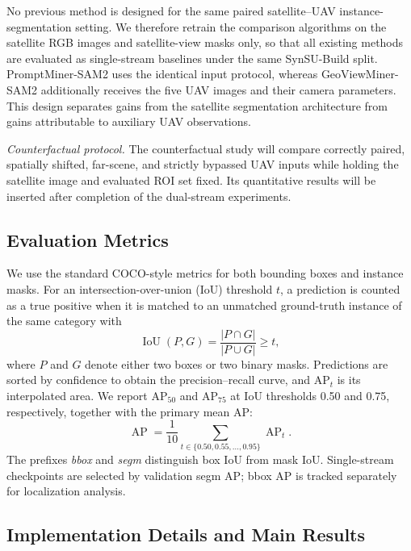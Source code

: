 \documentclass[letterpaper,journal]{IEEEtran}
\begin{document}
No previous method is designed for the same paired satellite--UAV instance-segmentation setting. We therefore retrain the comparison algorithms on the satellite RGB images and satellite-view masks only, so that all existing methods are evaluated as single-stream baselines under the same SynSU-Build split. PromptMiner-SAM2 uses the identical input protocol, whereas GeoViewMiner-SAM2 additionally receives the five UAV images and their camera parameters. This design separates gains from the satellite segmentation architecture from gains attributable to auxiliary UAV observations.

\noindent\textit{Counterfactual protocol.}
The counterfactual study will compare correctly paired, spatially shifted, far-scene, and strictly bypassed UAV inputs while holding the satellite image and evaluated ROI set fixed. Its quantitative results will be inserted after completion of the dual-stream experiments.

\subsection{Evaluation Metrics}
\label{sec:evaluation_metrics}
We use the standard COCO-style metrics for both bounding boxes and instance masks. For an intersection-over-union (IoU) threshold $t$, a prediction is counted as a true positive when it is matched to an unmatched ground-truth instance of the same category with
\begin{equation}
\operatorname{IoU}(P,G)=\frac{|P\cap G|}{|P\cup G|}\geq t,
\end{equation}
where $P$ and $G$ denote either two boxes or two binary masks. Predictions are sorted by confidence to obtain the precision--recall curve, and AP$_t$ is its interpolated area. We report AP$_{50}$ and AP$_{75}$ at IoU thresholds 0.50 and 0.75, respectively, together with the primary mean AP:
\begin{equation}
\operatorname{AP}=\frac{1}{10}\sum_{t\in\{0.50,0.55,\ldots,0.95\}}\operatorname{AP}_t.
\end{equation}
The prefixes \emph{bbox} and \emph{segm} distinguish box IoU from mask IoU. Single-stream checkpoints are selected by validation segm AP; bbox AP is tracked separately for localization analysis.

\subsection{Implementation Details and Main Results}
\label{sec:implementation_results}
\end{document}
